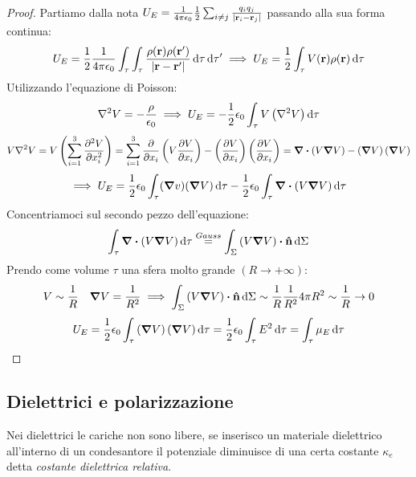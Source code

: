 \documentclass[12pt,a4paper]{article}
\begin{document}
\begin{proof}
    Partiamo dalla nota $U_{E}= \frac{1}{4\pi\epsilon_0}\frac{1}{2}\sum_{i\neq j}\frac{q_iq_j}{\abs{\vb{r}_i-\vb{r}_j}} $ passando alla sua forma continua:
    \begin{equation*}
        U_E= \frac{1}{2}\frac{1}{4\pi\epsilon_0}\int_\tau\int_\tau\frac{\rho(\vb{r})\rho(\vb{r}')}{\abs{\vb{r}-\vb{r}'}}\dd{\tau}\dd{\tau'}\implies
        U_E= \frac{1}{2}\int_\tau V(\vb{r})\rho(\vb{r}) \dd{\tau}
    \end{equation*}
    Utilizzando l'equazione di Poisson:
    \begin{equation*}
        \laplacian V = -\frac{\rho}{\epsilon_0}\implies U_E = -\frac{1}{2}\epsilon_0\int_\tau V \left( \laplacian{V} \right)\dd{\tau}
    \end{equation*}
    \begin{equation*}
        V \laplacian{V}= V \left(\sum_{i=1}^{3} \pdv[2]{V}{x_i}\right)= \sum_{i=1}^{3}\pdv{}{x_i}\left( V \pdv{V}{x_i} \right)- \left( \pdv{V}{x_i} \right)\left( \pdv{V}{x_i} \right)
        = \div \left( V \grad{V} \right)- \left( \grad{V} \right)\left( \grad{V} \right) 
    \end{equation*}
    \begin{equation*}
       \implies U_E = \frac{1}{2} \epsilon_0\int_\tau(\grad{v})(\grad{V}) \dd{\tau}-\frac{1}{2}\epsilon_0\int_\tau\div(V\grad{V})\dd{\tau}
    \end{equation*}
    Concentriamoci sul secondo pezzo dell'equazione:
    \begin{equation*}
        \int_\tau\div(V\grad{V})\dd{\tau} \overset{Gauss}{=} \int_\Sigma\left( V\grad{V} \right)\vdot\vu{n}\dd{\Sigma}
    \end{equation*}
    Prendo come volume $\tau$ una sfera molto grande $(R\rightarrow+\infty)$:
    \begin{equation*}
        V \sim \frac{1}{R}  \quad\grad{V}= \frac{1}{R^2}\implies \int_\Sigma \left( V\grad{V} \right)\vdot\vu{n}\dd{\Sigma}
        \sim \frac{1}{R}\frac{1}{R^2}4\pi R^2 \sim \frac{1}{R}\rightarrow 0 
    \end{equation*}
    \begin{equation*}
        U_E = \frac{1}{2}\epsilon_0\int_{\tau}\left( \grad{V} \right)\left( \grad{V} \right)\dd{\tau}= \frac{1}{2}\epsilon_0\int_{\tau}
        E^2 \dd{\tau}= \int_\tau  \mu_E \dd{\tau}
    \end{equation*}
\end{proof}

\subsection{Dielettrici e polarizzazione}
Nei dielettrici le cariche non sono libere, se inserisco un materiale dielettrico all'interno di un condesantore 
il potenziale diminuisce di una certa costante $\kappa_e$ detta \textit{costante dielettrica relativa}.
\end{document}
